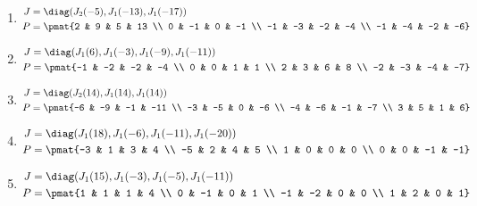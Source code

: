 \begin{enumerate}
\item

\begin{align*}
J &= \diag(J_{2}(-5), J_{1}(-13), J_{1}(-17))\\
P &= \pmat{2 & 9 & 5 & 13 \\ 0 & -1 & 0 & -1 \\ -1 & -3 & -2 & -4 \\ -1 & -4 & -2 & -6}
\end{align*}

\item

\begin{align*}
J &= \diag(J_{1}(6), J_{1}(-3), J_{1}(-9), J_{1}(-11))\\
P &= \pmat{-1 & -2 & -2 & -4 \\ 0 & 0 & 1 & 1 \\ 2 & 3 & 6 & 8 \\ -2 & -3 & -4 & -7}
\end{align*}

\item

\begin{align*}
J &= \diag(J_{2}(14), J_{1}(14), J_{1}(14))\\
P &= \pmat{-6 & -9 & -1 & -11 \\ -3 & -5 & 0 & -6 \\ -4 & -6 & -1 & -7 \\ 3 & 5 & 1 & 6}
\end{align*}

\item

\begin{align*}
J &= \diag(J_{1}(18), J_{1}(-6), J_{1}(-11), J_{1}(-20))\\
P &= \pmat{-3 & 1 & 3 & 4 \\ -5 & 2 & 4 & 5 \\ 1 & 0 & 0 & 0 \\ 0 & 0 & -1 & -1}
\end{align*}

\item

\begin{align*}
J &= \diag(J_{1}(15), J_{1}(-3), J_{1}(-5), J_{1}(-11))\\
P &= \pmat{1 & 1 & 1 & 4 \\ 0 & -1 & 0 & 1 \\ -1 & -2 & 0 & 0 \\ 1 & 2 & 0 & 1}
\end{align*}


\end{enumerate}
